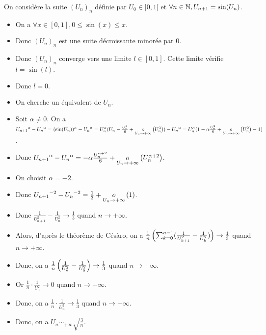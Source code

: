 \documentclass[12pt, a4paper]{report}
\begin{document}
\begin{example}
    On considère la suite $(U_n)_n$ définie par $U_0 \in ]0,1[$ et $\forall n \in \mathbb{N}, U_{n+1} = \sin(U_n)$.

    \begin{itemize}
        \item On a $\forall x \in [0,1], 0 \le \sin(x) \le x$.
        \item Donc $(U_n)_n$ est une suite décroissante minorée par $0$.
        \item Donc $(U_n)_n$ converge vers une limite $l \in [0,1]$. Cette limite vérifie $l = \sin(l)$.
        \item Donc $l=0$.
        \item On cherche un équivalent de $U_n$.
        \item Soit $\alpha\ne0$. On a ${U_{n+1}}^\alpha - {U_n}^\alpha = (\sin(U_n))^\alpha - {U_n}^\alpha \\=U_n^\alpha(U_n - \frac{U_n^3}{6} + \underset{U_n\to+\infty}{o}\left(U_n^3\right))- {U_n}^\alpha\\=U_n^\alpha(1-\alpha\frac{U_n^2}{6} + \underset{U_n\to+\infty}{o}\left(U_n^2\right)-1)$.
        \item Donc ${U_{n+1}}^\alpha - {U_n}^\alpha = -\alpha \frac{U_n^{\alpha + 2}}{6} + \underset{U_n\to+\infty}{o}\left(U_n^{\alpha + 2}\right)$.
        \item On choisit $\alpha = -2$.
        \item Donc ${U_{n+1}}^{-2} - {U_n}^{-2} = \frac{1}{3} + \underset{U_n\to+\infty}{o}\left(1\right)$.
        \item Donc $\frac{1}{U_{n+1}^2} - \frac{1}{U_n^2} \to \frac{1}{3}$ quand $n \to +\infty$.
        \item Alors, d'après le théorème de Césàro, on a $\frac1n \left(\sum_{k=0}^{n-1}(\frac{1}{U_{k+1}^2} - \frac{1}{U_k^2})\right) \to \frac{1}{3}$ quand $n \to +\infty$.
        \item Donc, on a $\frac{1}{n} \left(\frac{1}{U_{n}^2} - \frac{1}{U_0^2}\right) \to \frac{1}{3}$ quand $n \to +\infty$.
        \item Or $\frac{1}{n} \cdot \frac{1}{U_0^2} \to 0$ quand $n \to +\infty$.
        \item Donc, on a $\frac{1}{n} \cdot \frac{1}{U_n^2} \to \frac{1}{3}$ quand $n \to +\infty$.
        \item Donc, on a $U_n \sim_{+\infty} \sqrt{\frac{3}{n}}$.
    \end{itemize}
\end{example}
\end{document}
